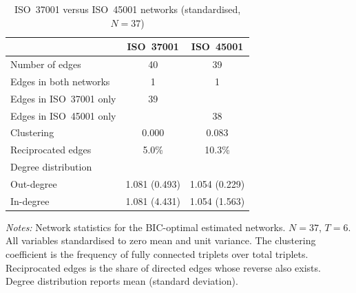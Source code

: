 \begin{table}[htbp]
\centering
\caption{ISO~37001 versus ISO~45001 networks (standardised, $N=37$)}
\label{tab:networks_std}
\begin{tabular}{lcc}
\hline\hline
 & ISO~37001 & ISO~45001 \\
\hline
Number of edges & 40 & 39 \\
Edges in both networks & 1 & 1 \\
Edges in ISO~37001 only & 39 & \\
Edges in ISO~45001 only & & 38 \\
Clustering & 0.000 & 0.083 \\
Reciprocated edges & 5.0\% & 10.3\% \\
Degree distribution & & \\
\quad Out-degree & 1.081 (0.493) & 1.054 (0.229) \\
\quad In-degree & 1.081 (4.431) & 1.054 (1.563) \\
\hline\hline
\end{tabular}
\begin{minipage}{0.85\textwidth}
\vspace{4pt}
\footnotesize \textit{Notes:} Network statistics for the BIC-optimal estimated networks. $N=37$, $T=6$. All variables standardised to zero mean and unit variance. The clustering coefficient is the frequency of fully connected triplets over total triplets. Reciprocated edges is the share of directed edges whose reverse also exists. Degree distribution reports mean (standard deviation).
\end{minipage}
\end{table}
